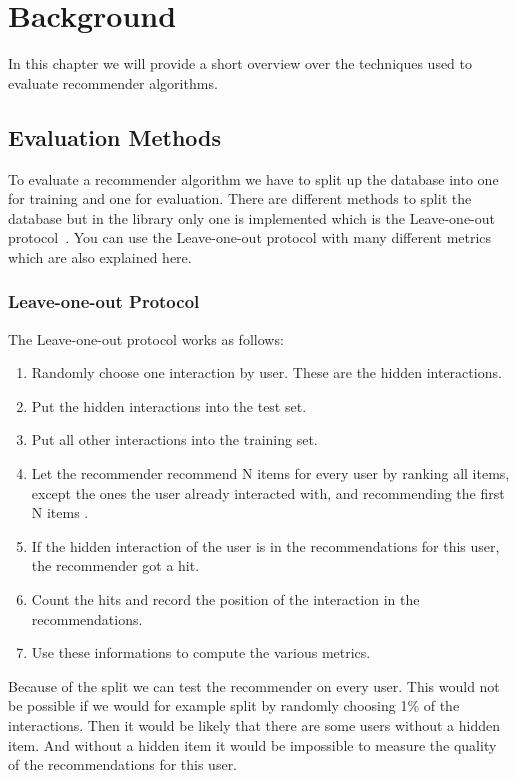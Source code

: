 
\chapter{Background}
\label{background}
In this chapter we will provide a short overview over the techniques
used to evaluate recommender algorithms.


\section{Evaluation Methods}

To evaluate a recommender algorithm we have to split up the database
into one for training and one for evaluation. There are different
methods to split the database but in the library only one is implemented
which is the Leave-one-out protocol~\cite{leaveoneout}.
You can use the Leave-one-out protocol with many different metrics
which are also explained here.


\subsection{Leave-one-out Protocol}
\label{leaveoneout}

The Leave-one-out protocol works as follows:
\begin{enumerate}
\item Randomly choose one interaction by user. These are the hidden
interactions.
\item Put the hidden interactions into the test set.
\item Put all other interactions into the training set.
\item Let the recommender recommend N items for every user by ranking
all items, except the ones the user already interacted with,
and recommending the first N items .
\item If the hidden interaction of the user is in the recommendations
for this user, the recommender got a hit.
\item Count the hits and record the position of the interaction in the 
recommendations.
\item Use these informations to compute the various metrics.

\end{enumerate}
Because of the split we can test the recommender on every user.
This would not be possible
if we would for example split by randomly choosing 1\% of the interactions.
Then it would be likely that there are some users without a hidden item.
And without a hidden item it would be impossible to measure the quality
of the recommendations for this user.



